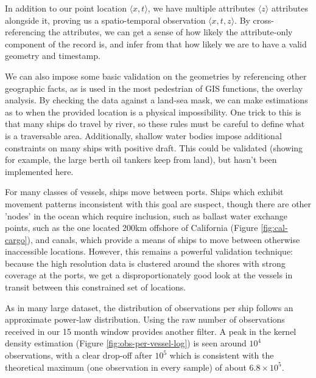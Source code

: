 In addition to our point location $\langle x,t \rangle$, we have multiple attributes $\langle z \rangle$ attributes alongside it, proving us a spatio-temporal observation $\langle x,t,z \rangle$. By cross-referencing the attributes, we can get a sense of how likely the attribute-only component of the record is, and infer from that how likely we are to have a valid geometry and timestamp.

We can also impose some basic validation on the geometries by referencing other geographic facts, as is used in the most pedestrian of GIS functions, the overlay analysis. By checking the data against a land-sea mask, we can make estimations as to when the provided location is a physical impossibility. One trick to this is that many ships do travel by river, so these rules must be careful to define what is a traversable area. Additionally, shallow water bodies impose additional constraints on many ships with positive draft. This could be validated (showing for example, the large berth oil tankers keep from land), but hasn't been implemented here.

For many classes of vessels, ships move between ports. Ships which exhibit movement patterns inconsistent with this goal are suspect, though there are other 'nodes' in the ocean which require inclusion, such as ballast water exchange points, such as the one located 200km offshore of California (Figure \ref{fig:cal-cargo}), and canals, which provide a means of ships to move between otherwise inaccessible locations. However, this remains a powerful validation technique: because the high resolution data is clustered around the shores with strong coverage at the ports, we get a disproportionately good look at the vessels in transit between this constrained set of locations.

As in many large dataset, the distribution of observations per ship follows an approximate power-law distribution. Using the raw number of observations received in our 15 month window provides another filter. A peak in the kernel density estimation (Figure \ref{fig:obs-per-vessel-log}) is seen around $10^4$ observations, with a clear drop-off after $10^5$ which is consistent with the theoretical maximum (one observation in every sample) of about $6.8 \times 10^5$.

